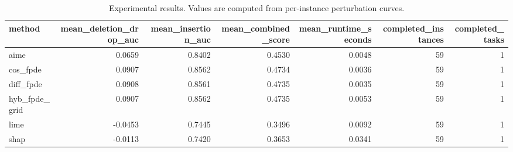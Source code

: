 \begin{table}[t]
\caption{Experimental results. Values are computed from per-instance perturbation curves.}
\label{tab:main_results_computed}
\centering
\begin{tabular}{lrrrrrr}
\toprule
method & mean\_deletion\_drop\_auc & mean\_insertion\_auc & mean\_combined\_score & mean\_runtime\_seconds & completed\_instances & completed\_tasks \\
\midrule
aime & 0.0659 & 0.8402 & 0.4530 & 0.0048 & 59 & 1 \\
cos\_fpde & 0.0907 & 0.8562 & 0.4734 & 0.0036 & 59 & 1 \\
diff\_fpde & 0.0908 & 0.8561 & 0.4735 & 0.0035 & 59 & 1 \\
hyb\_fpde\_grid & 0.0907 & 0.8562 & 0.4735 & 0.0053 & 59 & 1 \\
lime & -0.0453 & 0.7445 & 0.3496 & 0.0092 & 59 & 1 \\
shap & -0.0113 & 0.7420 & 0.3653 & 0.0341 & 59 & 1 \\
\bottomrule
\end{tabular}

\end{table}
